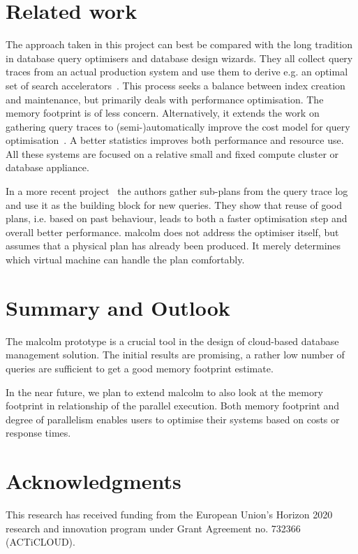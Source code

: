 \documentclass[conference]{IEEEtran}
\def\Skip{\par\medskip\nobreak\noindent}
\begin{document}
\section{Related work}
The approach taken in this project can best be compared with the long tradition in database query optimisers and database design wizards.
They all collect query traces from an actual production system and use them to derive e.g. an optimal set of search accelerators~\cite{DBLP:conf/vldb/ChaudhuriN07}.
This process seeks a balance between index creation and maintenance, but primarily deals with performance optimisation.
The memory footprint is of less concern.
Alternatively, it extends the work on gathering query traces to (semi-)automatically improve the cost model for query optimisation~\cite{DBLP:journals/ibmsj/MarklLR03}.
A better statistics improves both performance and resource use.
All these systems are focused on a relative small and fixed compute cluster or database appliance.

In a more recent project~\cite{DBLP:journals/pvldb/DingDWCN18} the authors gather sub-plans from the query trace log and use it as the building block for new queries.
They show that reuse of good plans, i.e. based on past behaviour, leads to both a faster optimisation step and overall better performance.
{\sc malcolm} does not address the optimiser itself, but assumes that a physical plan has already been produced.
It merely determines which virtual machine can handle the plan comfortably.

\section{Summary and Outlook\label{summary}} 
The {\sc malcolm} prototype is a crucial tool in the design of cloud-based database management solution.
The initial results are promising, a rather low number of queries are sufficient to get a good memory footprint estimate.

In the near future, we plan to extend {\sc malcolm} to also look at the memory footprint in relationship of the parallel execution.
Both memory footprint and degree of parallelism enables users to optimise their systems based on costs or response times.

\section*{Acknowledgments}
This research has received funding from the European Union’s Horizon 2020 research and innovation program under Grant Agreement no. 732366 (ACTiCLOUD).


\end{document}
